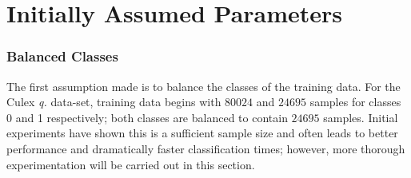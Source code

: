             
    \section{Initially Assumed Parameters}
    \label{subsec:exp-clf-ass}
        \subsubsection{Balanced Classes}
        \label{subsubsec:exp-clf-ass-bal}
            The first assumption made is to balance the classes of the training data. For the Culex \textit{q.} data-set, training data begins with $80024$ and $24695$ samples for classes 0 and 1 respectively; both classes are balanced to contain $24695$ samples. Initial experiments have shown this is a sufficient sample size and often leads to better performance and dramatically faster classification times; however, more thorough experimentation will be carried out in this section.
    
